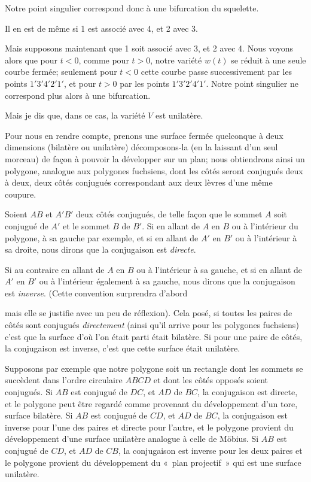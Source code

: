 \documentclass{article}
\begin{document}
Notre point singulier correspond donc à une bifurcation du squelette.

Il en est de même si 1 est associé avec 4, et 2 avec 3.

Mais supposons maintenant que 1 soit associé avec 3, et 2 avec 4. Nous voyons alors que pour $t < 0$, comme pour $t > 0$, notre variété $w(t)$ se réduit à une seule courbe fermée; seulement pour $t < 0$ cette courbe passe successivement par les points $1'3'4'2'1'$, et pour $t > 0$ par les points $1'3'2'4'1'$. Notre point singulier ne correspond plus alors à une bifurcation.

Mais je dis que, dans ce cas, la variété $V$ est unilatère.

Pour nous en rendre compte, prenons une surface fermée quelconque à deux dimensions (bilatère ou unilatère) décomposons-la (en la laissant d'un seul morceau) de façon à pouvoir la développer sur un plan; nous obtiendrons ainsi un polygone, analogue aux polygones fuchsiens, dont les côtés seront conjugués deux à deux, deux côtés conjugués correspondant aux deux lèvres d'une même coupure.

Soient $AB$ et $A'B'$ deux côtés conjugués, de telle façon que le sommet $A$ soit conjugué de $A'$ et le sommet $B$ de $B'$. Si en allant de $A$ en $B$ ou à l'intérieur du polygone, à sa gauche par exemple, et si en allant de $A'$ en $B'$ ou à l'intérieur à sa droite, nous dirons que la conjugaison est \emph{directe}.

Si au contraire en allant de $A$ en $B$ ou à l'intérieur à sa gauche, et si en allant de $A'$ en $B'$ ou à l'intérieur également à sa gauche, nous dirons que la conjugaison est \emph{inverse}. (Cette convention surprendra d'abord

mais elle se justifie avec un peu de réflexion). Cela posé, si toutes les paires de côtés sont conjugués \emph{directement} (ainsi qu'il arrive pour les polygones fuchsiens) c'est que la surface d'où l'on était parti était bilatère. Si pour une paire de côtés, la conjugaison est inverse, c'est que cette surface était unilatère.

Supposons par exemple que notre polygone soit un rectangle dont les sommets se succèdent dans l'ordre circulaire $ABCD$ et dont les côtés opposés soient conjugués. Si $AB$ est conjugué de $DC$, et $AD$ de $BC$, la conjugaison est directe, et le polygone peut être regardé comme provenant du développement d'un tore, surface bilatère. Si $AB$ est conjugué de $CD$, et $AD$ de $BC$, la conjugaison est inverse pour l'une des paires et directe pour l'autre, et le polygone provient du développement d'une surface unilatère analogue à celle de Möbius. Si $AB$ est conjugué de $CD$, et $AD$ de $CB$, la conjugaison est inverse pour les deux paires et le polygone provient du développement du «~plan projectif~» qui est une surface unilatère.
\end{document}
